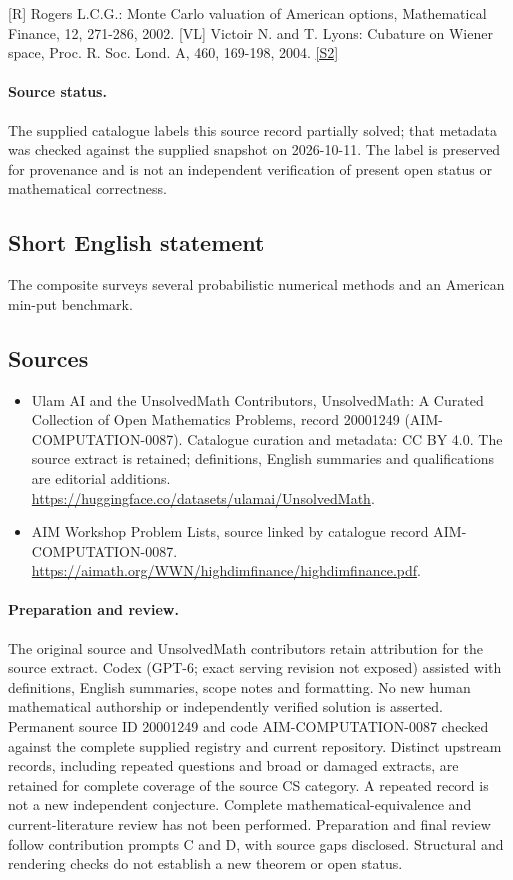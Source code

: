 \documentclass[11pt]{article}
\begin{document}
[R] Rogers L.C.G.: Monte Carlo valuation of American options, Mathematical Finance, 12, 271-286, 2002. [VL] Victoir N. and T. Lyons: Cubature on Wiener space, Proc. R. Soc. Lond. A, 460, 169-198, 2004. \href{https://aimath.org/WWN/highdimfinance/highdimfinance.pdf}{[S2]}
\paragraph{Source status.}
The supplied catalogue labels this source record partially solved; that metadata was checked against the supplied snapshot on 2026-10-11. The label is preserved for provenance and is not an independent verification of present open status or mathematical correctness.
\subsection{Short English statement}
The composite surveys several probabilistic numerical methods and an American min-put benchmark.
\subsection{Sources}
\begin{itemize}
\item[S1] Ulam AI and the UnsolvedMath Contributors, UnsolvedMath: A Curated Collection of Open Mathematics Problems, record 20001249 (AIM-COMPUTATION-0087). Catalogue curation and metadata: CC BY 4.0. The source extract is retained; definitions, English summaries and qualifications are editorial additions.
\url{https://huggingface.co/datasets/ulamai/UnsolvedMath}.
\item[S2] AIM Workshop Problem Lists, source linked by catalogue record AIM-COMPUTATION-0087.
\url{https://aimath.org/WWN/highdimfinance/highdimfinance.pdf}.
\end{itemize}
\paragraph{Preparation and review.}
The original source and UnsolvedMath contributors retain attribution for the source extract. Codex (GPT-6; exact serving revision not exposed) assisted with definitions, English summaries, scope notes and formatting. No new human mathematical authorship or independently verified solution is asserted. Permanent source ID 20001249 and code AIM-COMPUTATION-0087 checked against the complete supplied registry and current repository. Distinct upstream records, including repeated questions and broad or damaged extracts, are retained for complete coverage of the source CS category. A repeated record is not a new independent conjecture. Complete mathematical-equivalence and current-literature review has not been performed. Preparation and final review follow contribution prompts C and D, with source gaps disclosed. Structural and rendering checks do not establish a new theorem or open status.
\label{end:20001249}
\end{document}
